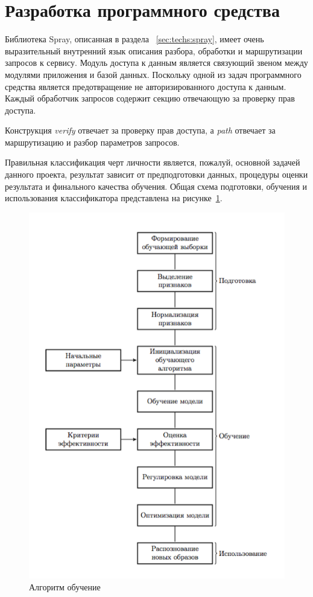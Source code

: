 \section{Разработка программного средства}
Библиотека Spray, описанная в раздела ~\ref{sec:techs:spray}, имеет очень выразительный внутренний язык описания разбора, обработки и маршрутизации запросов к сервису. Модуль доступа к данным является связующий звеном между модулями приложения и базой данных. Поскольку одной из задач программного средства является предотвращение не авторизированного доступа к данным. Каждый обработчик запросов содержит секцию отвечающую за проверку прав доступа.

Конструкция \emph{verify} отвечает за проверку прав доступа, а \emph{path} отвечает за маршрутизацию и разбор параметров запросов.

Правильная классификация черт личности является, пожалуй, основной задачей данного проекта, результат зависит от предподготовки данных, процедуры оценки результата и финального качества обучения. Общая схема подготовки, обучения и использования классификатора представлена на рисунке~\ref{fig:develoipment:svm_flow}.

\begin{figure}[ht]
    \centering
    \includegraphics[width=1\textwidth]{figures/SVM_flow.png}
    \caption{Алгоритм обучение}
    \label{fig:develoipment:svm_flow}
\end{figure}

